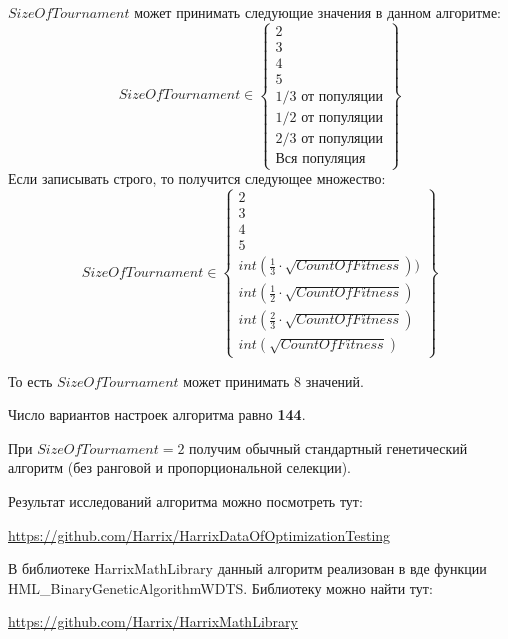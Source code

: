 $SizeOfTournament$ может принимать следующие значения в данном алгоритме:
\begin{equation}
SizeOfTournament \in \begin{Bmatrix}
2\\ 
3\\ 
4\\ 
5\\ 
1/3\text{ от популяции}\\ 
1/2\text{ от популяции}\\ 
2/3\text{ от популяции}\\ 
\text{Вся популяция} 
\end{Bmatrix}
\end{equation}
Если записывать строго, то получится следующее множество:
\begin{equation}
SizeOfTournament \in \begin{Bmatrix}
2\\ 
3\\ 
4\\ 
5\\ 
int\left( \frac{1}{3}\cdot  \sqrt{CountOfFitness}\right))  \\ 
int\left( \frac{1}{2}\cdot \sqrt{CountOfFitness}\right)\\ 
int\left( \frac{2}{3}\cdot  \sqrt{CountOfFitness}\right)\\ 
int\left( \sqrt{CountOfFitness}\right)
\end{Bmatrix}
\end{equation}

То есть $SizeOfTournament$ может принимать $ 8 $ значений.

Число вариантов настроек алгоритма равно \textbf{144}.

При $ SizeOfTournament=2 $ получим обычный стандартный генетический алгоритм (без ранговой и пропорциональной селекции).

Результат исследований алгоритма можно посмотреть тут:

\href{https://github.com/Harrix/HarrixDataOfOptimizationTesting}{https://github.com/Harrix/HarrixDataOfOptimizationTesting}

В библиотеке HarrixMathLibrary данный алгоритм реализован в вде функции HML\_BinaryGeneticAlgorithmWDTS. Библиотеку можно найти тут:

\href{https://github.com/Harrix/HarrixMathLibrary}{https://github.com/Harrix/HarrixMathLibrary}